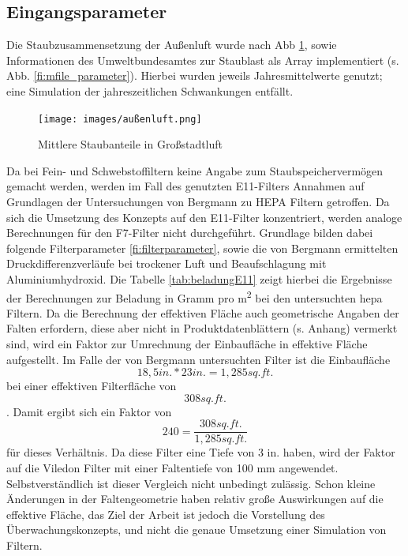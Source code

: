     \subsection{Eingangsparameter}
    Die Staubzusammensetzung der Außenluft wurde nach Abb \ref{fi:staubanteile}, sowie Informationen des Umweltbundesamtes zur Staublast \cite{uba_pm10} als Array implementiert (s. Abb. \ref{fi:mfile_parameter}). Hierbei wurden jeweils Jahresmittelwerte genutzt; eine Simulation der jahreszeitlichen Schwankungen entfällt.
    \begin{figure}[H]
        \begin{center}
            \texttt{[image: images/außenluft.png]}
            \caption[Außenluft Zusammensetzung]{Mittlere Staubanteile in Großstadtluft \cite{Grundlagen_Filtertechnik}}
            \label{fi:staubanteile}
        \end{center}
    \end{figure}
Da bei Fein- und Schwebstoffiltern keine Angabe zum Staubspeichervermögen gemacht werden, werden im Fall des genutzten E11-Filters Annahmen auf Grundlagen der Untersuchungen von Bergmann zu HEPA Filtern \cite{hepa} getroffen. Da sich die Umsetzung des Konzepts auf den E11-Filter konzentriert, werden analoge Berechnungen für den F7-Filter nicht durchgeführt.
Grundlage bilden dabei folgende Filterparameter \ref{fi:filterparameter}, sowie die von Bergmann ermittelten Druckdifferenzverläufe bei trockener Luft und Beaufschlagung mit Aluminiumhydroxid. Die Tabelle \ref{tab:beladungE11} zeigt hierbei die Ergebnisse der Berechnungen zur Beladung in Gramm pro \si{\square\meter} bei den untersuchten \ac{hepa} Filtern. Da die Berechnung der effektiven Fläche auch geometrische Angaben der Falten erfordern, diese aber nicht in Produktdatenblättern (s. Anhang) vermerkt sind, wird ein Faktor zur Umrechnung der Einbaufläche in effektive Fläche aufgestellt. Im Falle der von Bergmann untersuchten Filter ist die Einbaufläche \[ 18,5 in. * 23 in. = 1,285 sq. ft. \] bei einer effektiven Filterfläche von \[ 308 sq. ft. \]. Damit ergibt sich ein Faktor von \[
    240 = \frac{308 sq. ft.}{1,285 sq. ft.}
    \] für dieses Verhältnis. Da diese Filter eine Tiefe von 3 in. haben, wird der Faktor auf die Viledon Filter mit einer Faltentiefe von 100 mm angewendet. Selbstverständlich ist dieser Vergleich nicht unbedingt zulässig. Schon kleine Änderungen in der Faltengeometrie haben relativ große Auswirkungen auf die effektive Fläche, das Ziel der Arbeit ist jedoch die Vorstellung des Überwachungskonzepts, und nicht die genaue Umsetzung einer Simulation von Filtern.
